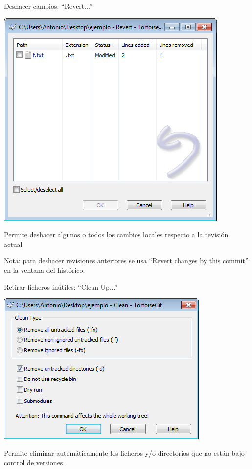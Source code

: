 \documentclass[xcolor=svgnames]{beamer}
\begin{document}
\begin{frame}{Deshacer cambios: ``Revert...''}
  \begin{center}
    \includegraphics[width=\textwidth,height=.7\textheight,keepaspectratio]{tomas/revert.png}
  \end{center}

  Permite deshacer algunos o todos los cambios locales respecto a la
  revisión actual.

  Nota: para deshacer revisiones anteriores se usa ``Revert changes by
  this commit'' en la ventana del histórico.
\end{frame}

\begin{frame}{Retirar ficheros inútiles: ``Clean Up...''}
  \begin{center}
    \includegraphics[width=\textwidth,height=.7\textheight,keepaspectratio]{tomas/cleanup.png}
  \end{center}

  Permite eliminar automáticamente los ficheros y/o directorios que no
  están bajo control de versiones.
\end{frame}
\end{document}
